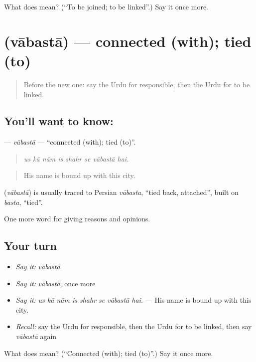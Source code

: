 \begin{tcolorbox}[breakable,colback=teal!4,colframe=teal!35!black,title={Before you move on}]
What does  mean? (\textquotedblleft{}To be joined; to be linked\textquotedblright{}.) Say it once more.
\end{tcolorbox}
\section[\texorpdfstring{\ur{وابستہ} (vābastā)}{وابستہ (vābastā)}]{ (vābastā) — connected (with); tied (to)}

\label{lesson:UR-C331-vabasta}



\begin{quote}
Before the new one: say the Urdu for responsible, then the Urdu for to be linked.
\end{quote}

\subsection*{You'll want to know: }
\textbf{} — \emph{vābastā} — \textquotedblleft{}connected (with); tied (to)\textquotedblright{}.

\begin{quote}
       
\end{quote}

\begin{quote}
\emph{us kā nām is shahr se vābastā hai.}
\end{quote}

\begin{quote}
His name is bound up with this city.
\end{quote}

\begin{cousinweb}
\textbf{} (\emph{vābastā}) is usually traced to Persian \emph{vābasta}, \textquotedblleft{}tied back, attached\textquotedblright{}, built on \emph{basta}, \textquotedblleft{}tied\textquotedblright{}.
\end{cousinweb}

\begin{grammarlens}[title={What you've built}]
One more word for giving reasons and opinions.
\end{grammarlens}

\subsection*{Your turn}
\begin{itemize}
\raggedright
  \item \emph{Say it:} \emph{vābastā}
  \item \emph{Say it:} \emph{vābastā}, once more
  \item \emph{Say it:} \emph{us kā nām is shahr se vābastā hai.} — His name is bound up with this city.
  \item \emph{Recall:} say the Urdu for responsible, then the Urdu for to be linked, then say \emph{vābastā} again
\end{itemize}

\begin{tcolorbox}[breakable,colback=teal!4,colframe=teal!35!black,title={Before you move on}]
What does  mean? (\textquotedblleft{}Connected (with); tied (to)\textquotedblright{}.) Say it once more.
\end{tcolorbox}
